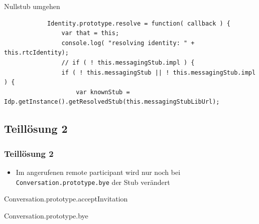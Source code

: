 \documentclass{beamer}
\begin{document}
\begin{frame}[fragile]
	\begin{exampleblock}{Nullstub umgehen}
		\begin{lstlisting}
			Identity.prototype.resolve = function( callback ) {
			    var that = this;
			    console.log( "resolving identity: " + this.rtcIdentity);
			    // if ( ! this.messagingStub.impl ) {
			    if ( ! this.messagingStub || ! this.messagingStub.impl ) {
			        var knownStub = Idp.getInstance().getResolvedStub(this.messagingStubLibUrl);
		\end{lstlisting}
		\end{exampleblock}
\end{frame}


\subsection{Teillösung 2}
\begin{frame}
	\frametitle{Teillösung 2}
	\begin{itemize}[<+->]
		\item Im angerufenen remote participant wird nur noch bei \texttt{Conversation.prototype.bye} der Stub verändert
	\end{itemize}

	\begin{exampleblock}{Conversation.prototype.acceptInvitation}
	
	\end{exampleblock}

	\begin{exampleblock}{Conversation.prototype.bye}
	
	\end{exampleblock}
\end{frame}
\end{document}
